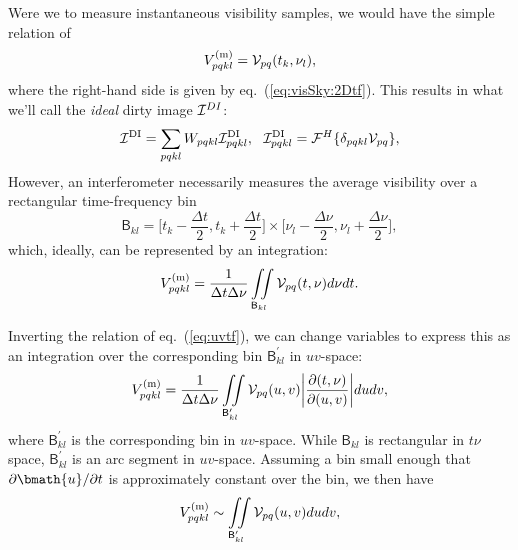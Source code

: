 \documentclass[useAMS,usenatbib]{mn2e}
\begin{document}
Were we to measure instantaneous visibility samples, we would have the simple relation of
\begin{equation}
V^\mathrm{(m)}_{pqkl}  = \mathcal{V}_{pq}(t_k,\nu_l),
\end{equation}
where the right-hand side is given by eq.~(\ref{eq:visSky:2Dtf}). This results in what we'll call the \emph{ideal} dirty image 
$\mathcal{I}^{DI}$:
\begin{equation}
\label{eq:imaging:DI}
\mathcal{I}^\mathrm{DI} =  \sum_{pqkl} W_{pqkl} \mathcal{I}^\mathrm{DI}_{pqkl},~~
\mathcal{I}^\mathrm{DI}_{pqkl} =  \mathcal{F}^H\{ \delta_{pqkl}\mathcal{V}_{pq} \},
\end{equation}
However, an interferometer necessarily measures the
average visibility over a rectangular time-frequency bin 
\begin{equation}
\mathsf{B}_{kl} = \bigg [ t_k-\frac{\Delta t}{2},t_k+\frac{\Delta t}{2} \bigg ]
\times
\bigg [ \nu_l-\frac{\Delta\nu}{2},\nu_l+\frac{\Delta\nu}{2} \bigg ],  
\end{equation}
which, ideally, can be represented by an integration:
\begin{equation}
V^\mathrm{(m)}_{pqkl} = \frac{1}{\Delta t \Delta \nu} 
\iint\limits_{\mathsf{B}_{kl}}
\mathcal{V}_{pq}(t,\nu)d\nu dt.
\label{eq2:conti}
\end{equation}

Inverting the relation of eq.~(\ref{eq:uvtf}), we can change variables to express this as an integration over the 
corresponding bin $\mathsf{B}^{\prime}_{kl}$ in $uv$-space:
\begin{equation}
V^\mathrm{(m)}_{pqkl} = \frac{1}{\Delta t \Delta \nu} 
\iint\limits_{\mathsf{B}^{\prime}_{kl}}
\mathcal{V}_{pq}(u,v)\bigg| \frac{\partial(t,\nu)}{\partial(u,v)}\bigg| dudv,
\label{eq2:conti:uv}
\end{equation}
where $\mathsf{B}^{\prime}_{kl}$ is the corresponding bin in $uv$-space. While $\mathsf{B}_{kl}$ is rectangular in $t\nu$ space, 
$\mathsf{B}^{\prime}_{kl}$ is an arc segment in $uv$-space. Assuming a bin small enough that 
$\partial\bmath{u}/\partial t$ is approximately constant over the bin, we then have
\begin{equation}
V^\mathrm{(m)}_{pqkl} \sim \iint\limits_{\mathsf{B}^{\prime}_{kl}}
\mathcal{V}_{pq}(u,v) dudv,
\label{eq2:conti:uv1}
\end{equation}

\end{document}
